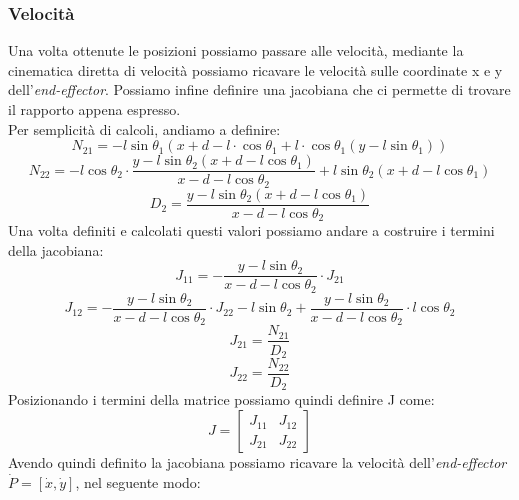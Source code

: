 \subsubsection{Velocità}\label{sec:CalcoloVelCin}
Una volta ottenute le posizioni possiamo passare alle velocità, mediante la cinematica diretta di velocità possiamo ricavare le velocità sulle coordinate x e y dell'\textit{end-effector}. Possiamo infine definire una jacobiana che ci permette di trovare il rapporto appena espresso. 
\\Per semplicità di calcoli, andiamo a definire:
\begin{equation*}
    N_{21} = -l\sin\theta_1 (x+d-l\cdot \cos\theta_1 + l\cdot \cos\theta_1 (y-l\sin\theta_1))
\end{equation*}
\begin{equation*}
    N_{22} = -l\cos\theta_2\cdot \frac{y-l\sin\theta_2 (x+d-l\cos\theta_1)}{x-d-l \cos\theta_2} +l\sin\theta_2(x+d-l\cos\theta_1)
\end{equation*}
\begin{equation*}
 D_2 = \frac{y-l\sin\theta_2 (x+d-l\cos\theta_1)}{x-d-l\cos\theta_2}
\end{equation*}
Una volta definiti e calcolati questi valori possiamo andare a costruire i termini della jacobiana:  
\begin{equation*}
    J_{11} = -\frac{y-l\sin\theta_2}{x-d-l\cos\theta_2}\cdot J_{21}
\end{equation*}
\begin{equation*}
    J_{12} = -\frac{y-l\sin\theta_2}{x-d-l\cos\theta_2}\cdot J_{22} - l\sin\theta_2 + \frac{y-l\sin\theta_2}{x-d-l\cos\theta_2}\cdot l\cos\theta_2
\end{equation*}
\begin{equation*}
    J_{21} = \frac{N_{21}}{D_2}
\end{equation*}
\begin{equation*}
    J_{22} = \frac{N_{22}}{D_2}
\end{equation*}
Posizionando i termini della matrice possiamo quindi definire J come:
\begin{equation}
    J = \begin{bmatrix}
    J_{11} & J_{12} \\ J_{21} & J_{22}
    \end{bmatrix}
    \label{eq:J12}
\end{equation}
Avendo quindi definito la jacobiana possiamo ricavare la velocità dell'\textit{end-effector}  $\dot{P} = [\dot{x},\dot{y}]$, nel seguente modo:
